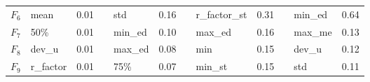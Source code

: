 \begin{table}[]
\begin{tabular}{|l|l|l|l|l|l|l|l|l|lll}
$F_6$                                        & \cellcolor[HTML]{FFCE93}mean                                     & \cellcolor[HTML]{FFCE93}0.01                                        &                                         & \cellcolor[HTML]{FFCE93}std                                      & \cellcolor[HTML]{FFCE93}0.16                                        &                                         & \cellcolor[HTML]{FFCE93}r\_factor\_st                            & \cellcolor[HTML]{FFCE93}0.31                                        & \multicolumn{1}{l|}{}                   & \multicolumn{1}{l|}{\cellcolor[HTML]{FFCE93}min\_ed}             & \multicolumn{1}{l|}{\cellcolor[HTML]{FFCE93}0.64}                   \\ \cline{1-3} \cline{5-6} \cline{8-9} \cline{11-12} 
$F_7$                                        & 50\%                                                             & 0.01                                                                &                                         & min\_ed                                                          & 0.10                                                                &                                         & max\_ed                                                          & 0.16                                                                & \multicolumn{1}{l|}{}                   & \multicolumn{1}{l|}{max\_me}                                     & \multicolumn{1}{l|}{0.13}                                           \\ \cline{1-3} \cline{5-6} \cline{8-9} \cline{11-12} 
$F_8$                                        & dev\_u                                                           & 0.01                                                                &                                         & max\_ed                                                          & 0.08                                                                &                                         & min                                                              & 0.15                                                                & \multicolumn{1}{l|}{}                   & \multicolumn{1}{l|}{dev\_u}                                      & \multicolumn{1}{l|}{0.12}                                           \\ \cline{1-3} \cline{5-6} \cline{8-9} \cline{11-12} 
$F_9$                                        & r\_factor                                                        & 0.01                                                                &                                         & 75\%                                                             & 0.07                                                                &                                         & min\_st                                                          & 0.15                                                                & \multicolumn{1}{l|}{}                   & \multicolumn{1}{l|}{std}                                         & \multicolumn{1}{l|}{0.11}                                           \\ \cline{1-3} \cline{5-6} \cline{8-9} \cline{11-12} 

\end{tabular}
\end{table}
